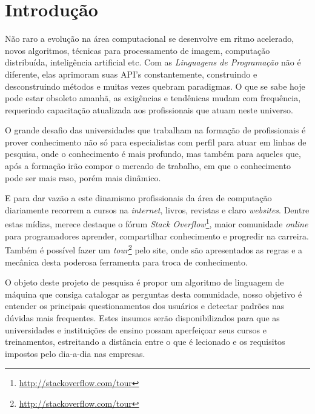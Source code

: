 \documentclass[
	12pt,				%
	openright,		%
	twoside,			%
	a4paper,			%
	english,				%
	french,				%
	spanish,			%
	brazil,				%
	]{abntex2}
\begin{document}
\chapter*[Introdução]{Introdução}

Não raro a evolução na área computacional se desenvolve em ritmo acelerado, novos algoritmos, técnicas para processamento de imagem, computação distribuída, inteligência artificial etc. Com as \emph{Linguagens de Programação} não é diferente, elas aprimoram suas API's constantemente, construindo e desconstruindo métodos e muitas vezes quebram paradigmas. O que se sabe hoje pode estar obsoleto amanhã, as exigências e tendênicas mudam com frequência, requerindo capacitação atualizada aos profissionais que atuam neste universo.  

O grande desafio das universidades que trabalham na formação de profissionais é prover conhecimento não só para especialistas com perfil para atuar em linhas de pesquisa, onde o conhecimento é mais profundo, mas também para aqueles que, após a formação irão compor o mercado de trabalho, em que o conhecimento pode ser mais raso, porém mais dinâmico.

E para dar vazão a este dinamismo profissionais da área de computação diariamente recorrem a cursos na \textit{internet}, livros, revistas e claro \textit{websites}. Dentre estas mídias, merece destaque o fórum \textit{Stack Overflow}\footnote{\url{http://stackoverflow.com/tour}}, maior comunidade \textit{online} para programadores aprender, compartilhar conhecimento e progredir na carreira. Também é possível fazer um \textit{tour}\footnote{\url{http://stackoverflow.com/tour}} pelo site, onde são apresentados as regras e a mecânica desta poderosa ferramenta para troca de conhecimento.

O objeto deste projeto de pesquisa é propor um algoritmo de linguagem de máquina que consiga catalogar as perguntas desta comunidade, nosso objetivo é entender os principais questionamentos dos usuários e detectar padrões nas dúvidas mais frequentes. Estes insumos serão disponibilizados para que as universidades e instituições de ensino possam aperfeiçoar seus cursos e treinamentos, estreitando a distância entre o que é lecionado e os requisitos impostos pelo dia-a-dia nas empresas.

\end{document}

